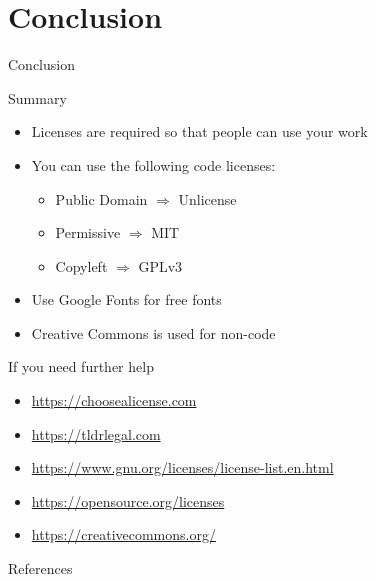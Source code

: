 \documentclass[compress,aspectratio=169]{beamer}
\begin{document}
  \section{Conclusion}

  \begin{frame}{Conclusion}
		\label{pg:lastpage} %
    \begin{block}{Summary}
      \begin{itemize}
        \item Licenses are required so that people can use your work
        \item You can use the following code licenses:
          \begin{itemize}
            \item Public Domain $\Rightarrow$ Unlicense
            \item Permissive $\Rightarrow$ MIT
            \item Copyleft $\Rightarrow$ GPLv3
          \end{itemize}
        \item Use Google Fonts for free fonts
        \item Creative Commons is used for non-code
      \end{itemize}
    \end{block}
  \end{frame}
  \begin{frame}{If you need further help}
      \begin{itemize}
        \item \href{https://choosealicense.com/}{\url{https://choosealicense.com}}
        \item \href{https://tldrlegal.com/}{\url{https://tldrlegal.com}}
        \item \href{https://www.gnu.org/licenses/license-list.en.html}{\url{https://www.gnu.org/licenses/license-list.en.html}}
        \item \href{https://opensource.org/licenses}{\url{https://opensource.org/licenses}}
        \item \href{https://creativecommons.org/}{\url{https://creativecommons.org/}}
      \end{itemize}
  \end{frame}

	\begin{frame}{References}
		\renewcommand*{\bibfont}{\normalfont\scriptsize}
		\printbibliography[heading=none]
	\end{frame}
\end{document}

